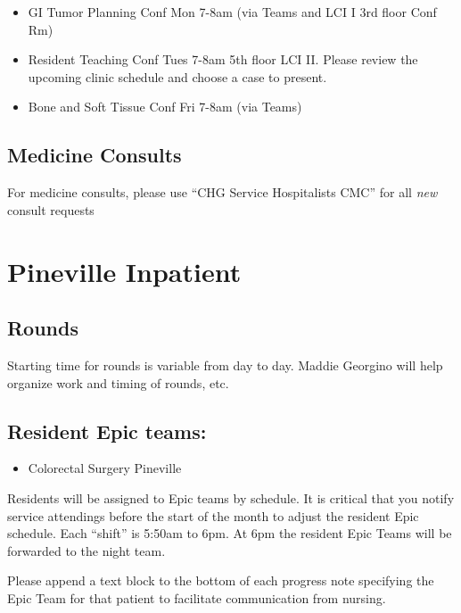 \documentclass[
  letterpaper,
]{scrbook}
\providecommand{\tightlist}{%
  \setlength{\itemsep}{0pt}\setlength{\parskip}{0pt}}
\begin{document}
\begin{itemize}
\tightlist
\item
  GI Tumor Planning Conf Mon 7-8am (via Teams and LCI I 3rd floor Conf
  Rm)
\item
  Resident Teaching Conf Tues 7-8am 5th floor LCI II. Please review the
  upcoming clinic schedule and choose a case to present.
\item
  Bone and Soft Tissue Conf Fri 7-8am (via Teams)
\end{itemize}

\section{Medicine Consults}\label{medicine-consults}

For medicine consults, please use ``CHG Service Hospitalists CMC'' for
all \emph{new} consult requests

\chapter{Pineville Inpatient}\label{pineville-inpatient}

\section{Rounds}\label{rounds-1}

Starting time for rounds is variable from day to day. Maddie Georgino
will help organize work and timing of rounds, etc.

\section{Resident Epic teams:}\label{resident-epic-teams-1}

\begin{itemize}
\tightlist
\item
  Colorectal Surgery Pineville
\end{itemize}

Residents will be assigned to Epic teams by schedule. It is critical
that you notify service attendings before the start of the month to
adjust the resident Epic schedule. Each ``shift'' is 5:50am to 6pm. At
6pm the resident Epic Teams will be forwarded to the night team.

Please append a text block to the bottom of each progress note
specifying the Epic Team for that patient to facilitate communication
from nursing.
\end{document}
